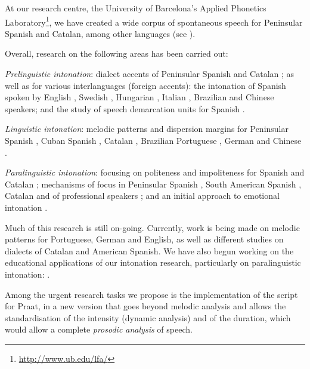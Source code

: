 \documentclass[output=paper]{langscibook}
\begin{document}
At our research centre, the University of Barcelona's Applied Phonetics Laboratory\footnote{\url{http://www.ub.edu/lfa/}}, we have created a wide corpus of spontaneous speech for Peninsular Spanish and Catalan, among other languages (see ).

Overall, research on the following areas has been carried out:

\textit{Prelinguistic intonation}: dialect accents of Peninsular Spanish \citep{BallesterosPanizo.2011,MateoRuiz.2014} and Catalan \citep{FontRotches.2014b,PonsLlabres.2014}; as well as for various interlanguages (foreign accents): the intonation of Spanish spoken by English \citep{MunozDuarte.2014}, Swedish \citep{Martorell.2010}, Hungarian \citep{BaditznePalvoelgyi2012}, Italian \citep{Devis.2011a}, Brazilian \citep{FonsecadeOliveira.2013} and Chinese \citep{CortesMoreno.2004,Liu2005} speakers; and the study of speech demarcation units for Spanish \citep{CabedoNebot.2013,MartinezHernandez.2015, MasManchon.2008}.

\textit{Linguistic intonation}: melodic patterns and dispersion margins for Peninsular Spanish \citep{CanteroSerena.2007}, Cuban Spanish \citep{GarciaRiveron.2010}, Catalan \citep{FontRotches.2007}, Brazilian Portuguese \citep{Araujo.2014,CanteroSerena.2013,Silva.2009,Mendes.2013}, German \citep{TorregrosaAzor.2011,TorregrosaAzor.2015,TorregrosaAzor.2016} and Chinese \citep{Kao.2011}.

\textit{Paralinguistic intonation}: focusing on politeness and impoliteness for Spanish \citep{DevisHerraiz.2011phonica} and Catalan \citep{DevisHerraiz.CanteroSerena.2014}; mechanisms of focus in Peninsular Spanish \citep{CanteroSerenaETAL.2005}, South American Spanish \citep{Pereira.2014,RuizMella.2011}, Catalan \citep{FontRotches.2011,FontRotches.2014} and of professional speakers \citep{FontRotchesMachucaAyuso.2010,FontRotchesMachucaAyuso.2010,FontRotchesPaloma.2013,Torrent.2012,Torrent.2015}; and an initial approach to emotional intonation \citep{CanteroSerena.2014}.

Much of this research is still on-going. Currently, work is being made on melodic patterns for Portuguese, German and English, as well as different studies on dialects of Catalan and American Spanish. We have also begun working on the educational applications of our intonation research, particularly on paralinguistic intonation: \citet{DevisHerraiz.2015,DevisHerraiz.Bartoli.2015}.

Among the urgent research tasks we propose is the implementation of the script for Praat, in a new version that goes beyond melodic analysis and allows the standardisation of the intensity (dynamic analysis) and of the duration, which would allow a complete \textit{prosodic analysis} of speech.
\end{document}
